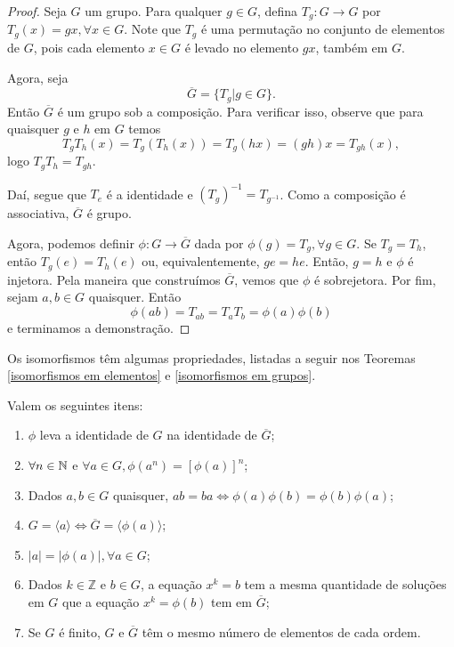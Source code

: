 	\begin{proof}
		Seja $G$ um grupo. Para qualquer $g\in G$, defina $T_g:G\to G$
		por $T_g(x) = gx, \forall x\in G$. Note que $T_g$ é uma
		permutação no conjunto de elementos de $G$, pois cada elemento
		$x\in G$ é levado no elemento $gx$, também em $G$.
		\par\vspace{0.3cm} Agora, seja 
		\begin{equation*}
		    \overline{G} = \{ T_g | g\in G \}.
		\end{equation*}
		Então $\overline{G}$ é um grupo sob a composição. 
		Para verificar isso, observe que para quaisquer $g$ e $h$ em $G$
		temos 
		\begin{equation*}
		    T_gT_h(x) = T_g(T_h(x)) = T_g(hx) = (gh)x = T_{gh}(x), 
        \end{equation*}
		logo $T_gT_h = T_{gh}$.
		\par\vspace{0.3cm} Daí, segue que $T_e$ é a identidade e
		$(T_g)^{-1} = T_{g^{-1}}$. Como a composição é associativa,
		$\overline{G}$ é grupo.
		\par\vspace{0.3cm} Agora, podemos definir 
		$\phi: G\to\overline{G}$ dada por 
		$\phi(g) = T_g, \forall g\in G$. Se $T_g = T_h$, então 
		$T_g(e) = T_h(e)$ ou, equivalentemente, $ge = he$. Então, 
		$g = h$ e $\phi$ é injetora. Pela maneira que construímos
		$\overline{G}$, vemos que $\phi$ é sobrejetora. Por fim, sejam
		$a,b\in G$ quaisquer. Então
		\[
		    \phi(ab) = T_{ab} = T_aT_b = \phi(a)\phi(b)
		\]
		e terminamos a demonstração.
	\end{proof}
	Os isomorfismos têm algumas propriedades, 
	listadas a seguir nos Teoremas \ref{isomorfismos em elementos} 
	e \ref{isomorfismos em grupos}.
	\begin{theorem}
	\label{isomorfismos em elementos}
	    Valem os seguintes itens:
		\begin{enumerate}
			\item \vspace{0.3cm} $\phi$ leva a identidade de $G$ na
			identidade de $\overline{G}$;
			\item $\forall n\in\mathbb{N}$ e $\forall a\in G, \phi (a^n) = [\phi (a)]^n$;
			\item Dados $a,b \in G$ quaisquer, 
			$ab = ba \iff \phi (a)\phi (b) = \phi (b)\phi (a)$;
			\item $G = \langle a \rangle \iff \overline{G} =
			\langle\phi(a) \rangle$;
			\item $|a| = |\phi(a)|, \forall a\in G$;
			\item Dados $k\in\mathbb{Z}$ e $b\in G$, a equação 
			$x^k = b$ tem a mesma quantidade de soluções em $G$ que a
			equação $x^k = \phi(b)$ tem em $\overline{G}$;
			\item Se $G$ é finito, $G$ e $\overline{G}$ têm o mesmo
			número de elementos de cada ordem. 
		\end{enumerate}
	\end{theorem}
